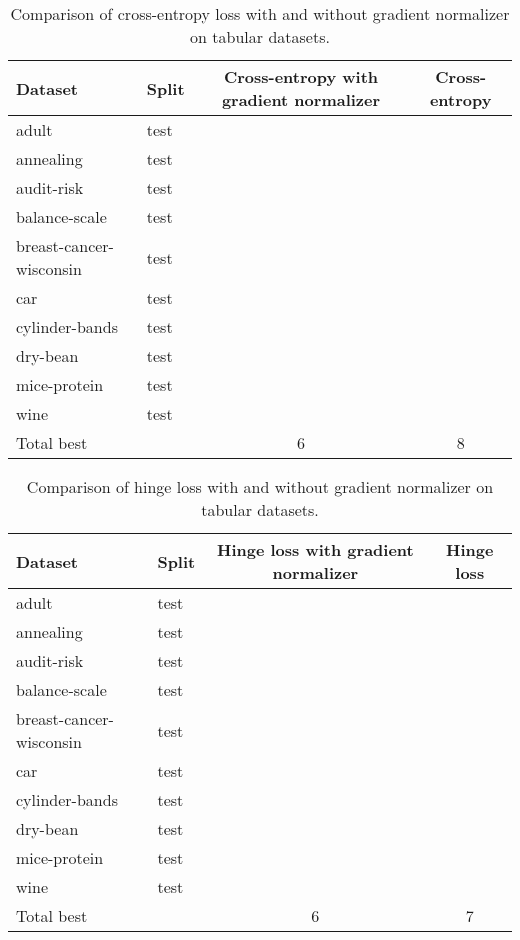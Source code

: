 \documentclass[nohyperref]{article}
\theoremstyle{plain}
\theoremstyle{definition}
\theoremstyle{remark}
\begin{document}
\begin{table*}[t]
\centering
\begin{tabular}{ll|cc}
Dataset & Split & Cross-entropy with gradient normalizer & Cross-entropy \\
\hline
adult                   & test &  &  \\
annealing               & test &  &  \\
audit-risk              & test &  &  \\
balance-scale           & test &  &  \\
breast-cancer-wisconsin & test &  &  \\
car                     & test &  &  \\
cylinder-bands          & test &  &  \\
dry-bean                & test &  &  \\
mice-protein            & test &  &  \\
wine                    & test &  &  \\
\hline
Total best & & 6 & 8 \\

\end{tabular}

\caption{Comparison of cross-entropy loss with and without gradient normalizer on tabular datasets.}
\label{tab:ablation-gnorm-xent}
\end{table*}

\begin{table*}[t]
\centering
\begin{tabular}{ll|cc}
Dataset & Split & Hinge loss with gradient normalizer & Hinge loss \\
\hline
adult                    & test &  &  \\
annealing                & test &  &  \\
audit-risk               & test &  &  \\
balance-scale            & test &  &  \\
breast-cancer-wisconsin  & test &  &  \\
car                      & test &  &  \\
cylinder-bands           & test &  &  \\
dry-bean                 & test &  &  \\
mice-protein             & test &  &  \\
wine                     & test &  &  \\
\hline
Total best & & 6 & 7 \\


\end{tabular}

\caption{Comparison of hinge loss with and without gradient normalizer on tabular datasets.}
\label{tab:ablation-gnorm-hinge}
\end{table*}
\end{document}

